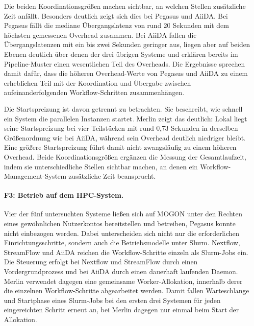 Die beiden Koordinationsgrößen machen sichtbar, an welchen Stellen zusätzliche Zeit anfällt. Besonders deutlich zeigt sich dies bei Pegasus und AiiDA. Bei Pegasus fällt die mediane Übergangslatenz von rund 20 Sekunden mit dem höchsten gemessenen Overhead zusammen. Bei AiiDA fallen die Übergangslatenzen mit ein bis zwei Sekunden geringer aus, liegen aber auf beiden Ebenen deutlich über denen der drei übrigen Systeme und erklären bereits im Pipeline-Muster einen wesentlichen Teil des Overheads. Die Ergebnisse sprechen damit dafür, dass die höheren Overhead-Werte von Pegasus und AiiDA zu einem erheblichen Teil mit der Koordination und Übergabe
zwischen aufeinanderfolgenden Workflow-Schritten zusammenhängen.

Die Startspreizung ist davon getrennt zu betrachten. Sie beschreibt, wie schnell ein System die parallelen Instanzen startet. Merlin zeigt das deutlich: Lokal liegt seine
Startspreizung bei vier Teilstücken mit rund 0,73 Sekunden in
derselben Größenordnung wie bei AiiDA, während sein Overhead
deutlich niedriger bleibt. Eine größere Startspreizung führt damit
nicht zwangsläufig zu einem höheren Overhead. Beide
Koordinationsgrößen ergänzen die Messung der Gesamtlaufzeit, indem
sie unterschiedliche Stellen sichtbar machen, an denen ein
Workflow-Management-System zusätzliche Zeit beansprucht.

\paragraph{F3: Betrieb auf dem HPC-System.}
Vier der fünf untersuchten Systeme ließen sich auf MOGON unter den
Rechten eines gewöhnlichen Nutzerkontos bereitstellen und
betreiben, Pegasus konnte nicht einbezogen werden. Dabei
unterscheiden sich nicht nur die erforderlichen
Einrichtungsschritte, sondern auch die Betriebsmodelle unter Slurm.
Nextflow, StreamFlow und AiiDA reichen die Workflow-Schritte
einzeln als Slurm-Jobs ein. Die Steuerung erfolgt bei Nextflow und
StreamFlow durch einen Vordergrundprozess und bei AiiDA durch einen
dauerhaft laufenden Daemon. Merlin verwendet dagegen eine
gemeinsame Worker-Allokation, innerhalb derer die einzelnen
Workflow-Schritte abgearbeitet werden. Damit fallen Warteschlange
und Startphase eines Slurm-Jobs bei den ersten drei Systemen für
jeden eingereichten Schritt erneut an, bei Merlin dagegen nur
einmal beim Start der Allokation.

